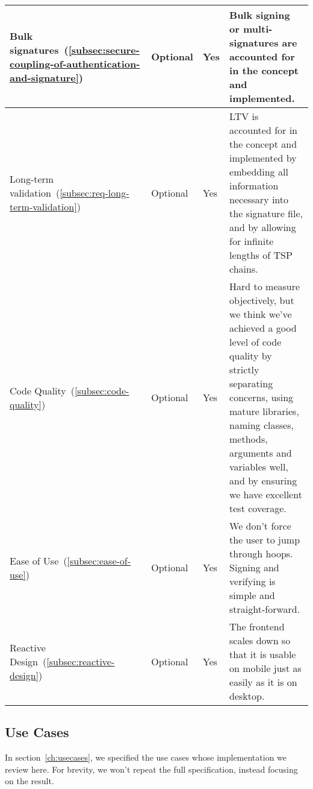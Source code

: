 \begin{center}
\begin{longtable}{p{4.0cm}|p{1.35cm}|p{0.7cm}|p{9.0cm}}
        \\
        \hline
        Bulk signatures~(\ref{subsec:secure-coupling-of-authentication-and-signature})
        & Optional
        & Yes
        & Bulk signing or multi-signatures are accounted for in the concept and implemented.
        \\
        \hline
        Long-term validation~(\ref{subsec:req-long-term-validation})
        & Optional
        & Yes
        & \gls{LTV} is accounted for in the concept and implemented by embedding all information
        necessary into the signature file, and by allowing for infinite lengths of \gls{TSP} chains.
        \\
        \hline
        Code Quality~(\ref{subsec:code-quality})
        & Optional
        & Yes
        & Hard to measure objectively,
        but we think we've achieved a good level of code quality by strictly separating concerns,
        using mature libraries,
        naming classes, methods, arguments and variables well,
        and by ensuring we have excellent test coverage.
        \\
        \hline
        Ease of Use~(\ref{subsec:ease-of-use})
        & Optional
        & Yes
        & We don't force the user to jump through hoops.
        Signing and verifying is simple and straight-forward.
        \\
        \hline
        Reactive Design~(\ref{subsec:reactive-design})
        & Optional
        & Yes
        & The frontend scales down so that it is usable on mobile just as easily as it is on desktop.
        \\
        \hline
    \end{longtable}
\end{center}

\subsection{Use Cases}\label{subsec:use-cases}
In section~\ref{ch:usecases},
we specified the use cases whose implementation we review here.
For brevity, we won't repeat the full specification,
instead focusing on the result.

